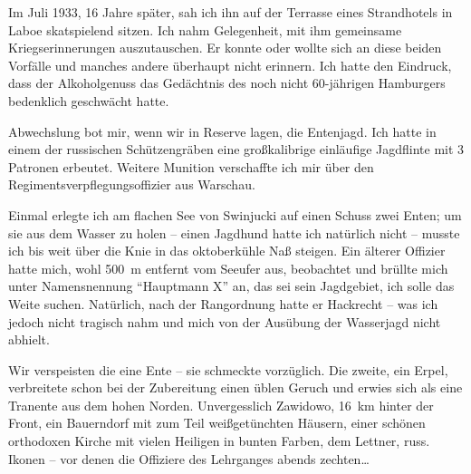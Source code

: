 Im Juli 1933, 16 Jahre später, sah ich ihn auf der Terrasse eines Strandhotels in Laboe skatspielend sitzen. Ich nahm Gelegenheit, mit ihm gemeinsame Kriegserinnerungen auszutauschen. Er konnte oder wollte sich an diese beiden Vorfälle und manches andere überhaupt nicht erinnern. Ich hatte den Eindruck, dass der Alkoholgenuss das Gedächtnis des noch nicht 60-jährigen Hamburgers bedenklich geschwächt hatte.

Abwechslung bot mir, wenn wir in Reserve lagen, die Entenjagd. Ich hatte in einem der russischen Schützengräben eine großkalibrige einläufige Jagdflinte mit 3 Patronen erbeutet. Weitere Munition verschaffte ich mir über den Regimentsverpflegungsoffizier aus Warschau.

Einmal erlegte ich am flachen See von Swinjucki auf einen Schuss zwei Enten; um sie aus dem Wasser zu holen -- einen Jagdhund hatte ich natürlich nicht -- musste ich bis weit über die Knie in das oktoberkühle Naß steigen. Ein älterer Offizier hatte mich, wohl 500~m entfernt vom Seeufer aus, beobachtet und brüllte mich unter Namensnennung \enquote{Hauptmann X} an, das sei sein Jagdgebiet, ich solle das Weite suchen. Natürlich, nach der Rangordnung hatte er Hackrecht -- was ich jedoch nicht tragisch nahm und mich von der Ausübung der Wasserjagd nicht abhielt.

Wir verspeisten die eine Ente -- sie schmeckte vorzüglich. Die zweite, ein Erpel, verbreitete schon bei der Zubereitung einen üblen Geruch und erwies sich als eine Tranente aus dem hohen Norden.
Unvergesslich Zawidowo, 16~km hinter der Front, ein Bauerndorf mit zum Teil weißgetünchten Häusern, einer schönen orthodoxen Kirche mit vielen Heiligen in bunten Farben, dem Lettner, russ. Ikonen -- vor denen die Offiziere des Lehrganges abends zechten\dots

